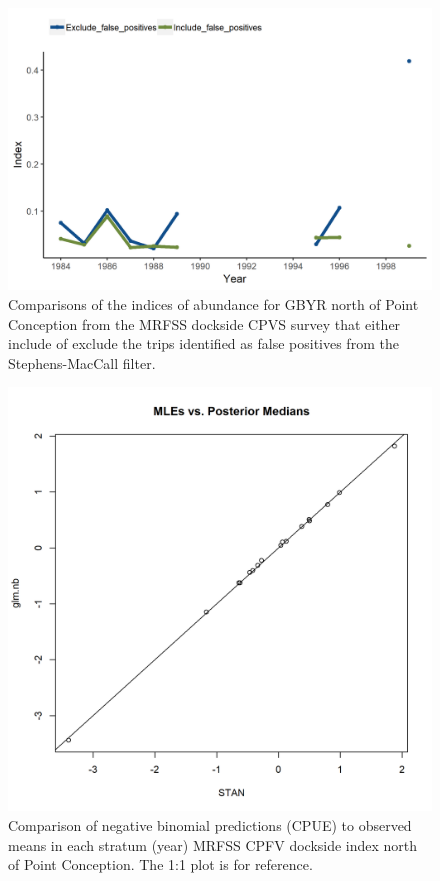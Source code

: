 \documentclass[12pt,]{article}
\begin{document}
\begin{figure}
\centering
\includegraphics{Figures/MRFSS_index_N_SM_falsepos.png}
\caption{Comparisons of the indices of abundance for GBYR north of Point
Conception from the MRFSS dockside CPVS survey that either include of
exclude the trips identified as false positives from the
Stephens-MacCall filter. \label{fig:MRFSS_index_N_SM_falsepos}}
\end{figure}

\begin{figure}
\centering
\includegraphics{Figures/Fleet10_MLE_stan.png}
\caption{Comparison of negative binomial predictions (CPUE) to observed
means in each stratum (year) MRFSS CPFV dockside index north of Point
Conception. The 1:1 plot is for reference. \label{fig:Fleet10_MLE_stan}}
\end{figure}
\end{document}
